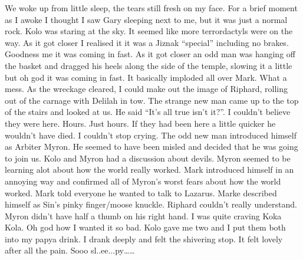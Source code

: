We woke up from little sleep, the tears still fresh on my face. For a brief moment as I awoke I thought I saw Gary sleeping next to me, but it was just a normal rock. Kolo was staring at the sky. It seemed like more terrordactyls were on the way. As it got closer I realised it it was a Jiznak “special” including no brakes. Goodness me it was coming in fast. As it got closer an odd man was hanging off the basket and dragged his heels along the side of the temple, slowing it a little but oh god it was coming in fast. It basically imploded all over Mark. What a mess. As the wreckage cleared, I could make out the image of Riphard, rolling out of the carnage with Delilah in tow. The strange new man came up to the top of the stairs and looked at us. He said “It’s all true isn’t it?”. I couldn’t believe they were here. Hours. Just hours. If they had been here a little quicker he wouldn’t have died. I couldn’t stop crying. The odd new man introduced himself as Arbiter Myron. He seemed to have been misled and decided that he was going to join us. Kolo and Myron had a discussion about devils. Myron seemed to be learning alot about how the world really worked. Mark introduced himself in an annoying way and confirmed all of Myron’s worst fears about how the world worked. Mark told everyone he wanted to talk to Lazarus. Marke described himself as Sin’s pinky finger/moose knuckle. Riphard couldn’t really understand. Myron didn’t have half a thumb on his right hand. I was quite craving Koka Kola. Oh god how I wanted it so bad. Kolo gave me two and I put them both into my papya drink. I drank deeply and felt the shivering stop. It felt lovely after all the pain. Sooo sl..ee...py……\medskip

